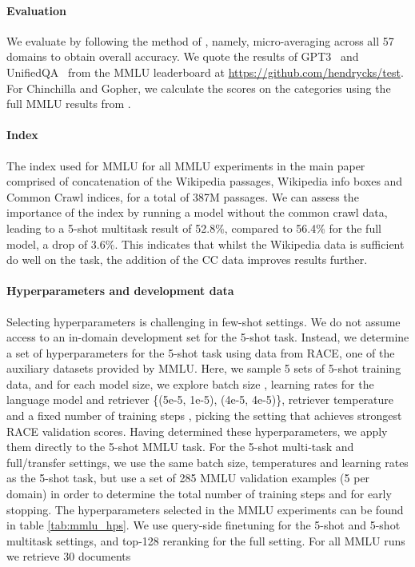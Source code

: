 \documentclass[10pt]{article} \usepackage[preprint]{tmlr}
\begin{document}
\paragraph{Evaluation} We evaluate by following the method of \citet{hendrycks2021mmlu}, namely, micro-averaging across all 57 domains to obtain overall accuracy. 
We quote the results of GPT3~\citep{brown2020gpt3} and UnifiedQA~\citep{khashabi-etal-2020-unifiedqa} from the MMLU leaderboard at \url{https://github.com/hendrycks/test}. For Chinchilla and Gopher, we calculate the scores on the categories using the full MMLU results from \citet{hoffmann2022chinchilla}.


\paragraph{Index} The index used for MMLU for all MMLU experiments in the main paper comprised of concatenation of the Wikipedia passages, Wikipedia info boxes and Common Crawl indices, for a total of 387M passages. We can assess the importance of the index by running a model without the common crawl data, leading to a 5-shot multitask result of 52.8\%, compared to 56.4\% for the full model, a drop of 3.6\%.
This indicates that whilst the Wikipedia data is sufficient do well on the task, the addition of the CC data improves results further.


\paragraph{Hyperparameters and development data} Selecting hyperparameters is challenging in few-shot settings.
We do not assume access to an in-domain development set for the 5-shot task. Instead, we determine a set of hyperparameters for the 5-shot task using data from RACE, one of the auxiliary datasets provided by MMLU. Here, we sample 5 sets of 5-shot training data, and for each model size, we explore batch size ,  learning rates for the language model and retriever \{(5e-5, 1e-5), (4e-5, 4e-5)\}, retriever temperature  and a fixed number of training steps , picking the setting that achieves strongest RACE validation scores.
Having determined these hyperparameters, we apply them directly to the 5-shot MMLU task.
For the 5-shot multi-task and full/transfer settings, we use the same batch size, temperatures and learning rates as the 5-shot task, but use a set of 285 MMLU validation examples (5 per domain) in order to determine the total number of training steps and for early stopping.
The hyperparameters selected in the MMLU experiments can be found in table \ref{tab:mmlu_hps}.
We use query-side finetuning for the 5-shot and 5-shot multitask settings, and top-128 reranking for the full setting. For all MMLU runs we retrieve 30 documents
\end{document}
